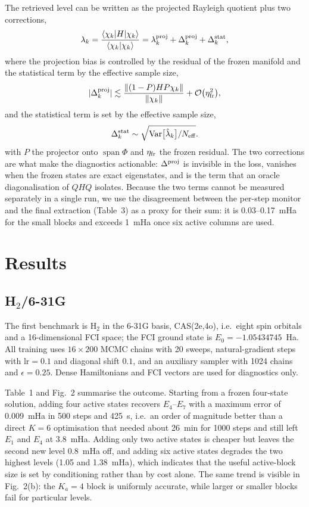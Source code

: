 \documentclass[10pt,a4paper]{article}
\newcommand{\braket}[2]{\langle #1\vert #2\rangle}
\newcommand{\bramat}[3]{\langle #1\vert #2\vert #3\rangle}
\begin{document}
The retrieved level can be written as the projected Rayleigh quotient plus two corrections,
\begin{equation}
\lambda_k=\frac{\bramat{\chi_k}{H}{\chi_k}}{\braket{\chi_k}{\chi_k}}
=\lambda_k^{\rm proj}+\Delta_k^{\rm proj}+\Delta_k^{\rm stat},
\end{equation}
where the projection bias is controlled by the residual of the frozen manifold and the statistical term by the effective sample size,
\begin{equation}
\lvert\Delta_k^{\rm proj}\rvert
\lesssim
\frac{\lVert(1-P)H P\chi_k\rVert}{\lVert\chi_k\rVert}
+\mathcal{O}\bigl(\eta_{\rm fr}^2\bigr),
\end{equation}
and the statistical term is set by the effective sample size,
\begin{equation}
\Delta_k^{\rm stat}\sim\sqrt{\operatorname{Var}\bigl[\hat\lambda_k\bigr]/N_{\rm eff}} .
\end{equation}
with $P$ the projector onto $\operatorname{span}\Phi$ and $\eta_{\rm fr}$ the frozen residual. The two corrections are what make the diagnostics actionable: $\Delta^{\rm proj}$ is invisible in the loss, vanishes when the frozen states are exact eigenstates, and is the term that an oracle diagonalisation of $QHQ$ isolates. Because the two terms cannot be measured separately in a single run, we use the disagreement between the per-step monitor and the final extraction (Table~3) as a proxy for their sum: it is 0.03--0.17~mHa for the small blocks and exceeds 1~mHa once six active columns are used.

\section{Results}

\subsection{H$_2$/6-31G}

The first benchmark is H$_2$ in the 6-31G basis, CAS(2e,4o), i.e.\ eight spin orbitals and a 16-dimensional FCI space; the FCI ground state is $E_0=-1.05434745$~Ha. All training uses $16\times200$ MCMC chains with 20 sweeps, natural-gradient steps with $\mathrm{lr}=0.1$ and diagonal shift $0.1$, and an auxiliary sampler with 1024 chains and $\epsilon=0.25$. Dense Hamiltonians and FCI vectors are used for diagnostics only.

Table~1 and Fig.~2 summarise the outcome. Starting from a frozen four-state solution, adding four active states recovers $E_4$--$E_7$ with a maximum error of 0.009~mHa in 500 steps and 425~s, i.e.\ an order of magnitude better than a direct $K=6$ optimisation that needed about 26~min for 1000 steps and still left $E_1$ and $E_4$ at 3.8~mHa. Adding only two active states is cheaper but leaves the second new level 0.8~mHa off, and adding six active states degrades the two highest levels (1.05 and 1.38~mHa), which indicates that the useful active-block size is set by conditioning rather than by cost alone. The same trend is visible in Fig.~2(b): the $K_a=4$ block is uniformly accurate, while larger or smaller blocks fail for particular levels.
\end{document}
